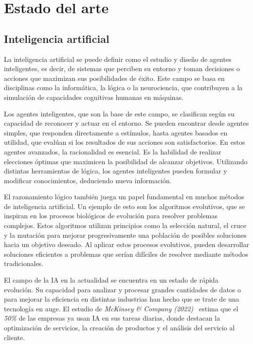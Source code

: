 \chapter{Estado del arte}
\label{ch:estado-arte}

\section{Inteligencia artificial}

La inteligencia artificial se puede definir como el estudio y diseño de agentes inteligentes, es decir, de sistemas que perciben su entorno y toman decisiones o acciones que maximizan sus posibilidades de éxito. Este campo se basa en disciplinas como la informática, la lógica o la neurociencia, que contribuyen a la simulación de capacidades cognitivas humanas en máquinas.

Los agentes inteligentes, que son la base de este campo, se clasifican según su capacidad de reconocer y actuar en el entorno. Se pueden encontrar desde agentes simples, que responden directamente a estímulos, hasta agentes basados en utilidad, que evalúan si los resultados de sus acciones son satisfactorios. En estos agentes avanzados, la racionalidad es esencial. Es la habilidad de realizar elecciones óptimas que maximicen la posibilidad de alcanzar objetivos. Utilizando distintas herramientas de lógica, los agentes inteligentes pueden formular y modificar conocimientos, deduciendo nueva información.

El razonamiento lógico también juega un papel fundamental en muchos métodos de inteligencia artificial. Un ejemplo de esto son los algoritmos evolutivos, que se inspiran en los procesos biológicos de evolución para resolver problemas complejos. Estos algoritmos utilizan principios como la selección natural, el cruce y la mutación para mejorar progresivamente una población de posibles soluciones hacia un objetivo deseado. Al aplicar estos procesos evolutivos, pueden desarrollar soluciones eficientes a problemas que serían difíciles de resolver mediante métodos tradicionales.

El campo de la IA en la actualidad se encuentra en un estado de rápida evolución. Su capacidad para analizar y procesar grandes cantidades de datos o para mejorar la eficiencia en distintas industrias han hecho que se trate de una tecnología en auge. El estudio de \textit{McKinsey \& Company (2022)}~\cite{mckinsey2022ai} estima que el \textit{50\%} de las empresas ya usan IA en sus tareas diarias, donde destacan la optimización de servicios, la creación de productos y el análisis del servicio al cliente.

